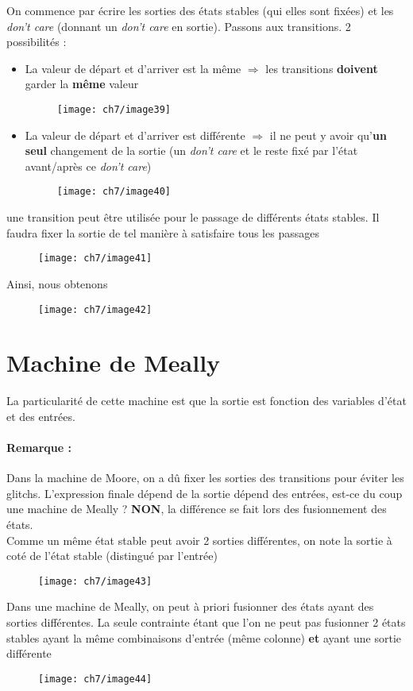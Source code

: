 On commence par écrire les sorties des états stables (qui elles sont fixées) et les \textit{don't care} (donnant un \textit{don't care} en sortie). Passons aux transitions. 2 possibilités :
\begin{itemize}
	\item La valeur de départ et d'arriver est la même $\Rightarrow$ les transitions \textbf{doivent} garder la \textbf{même} valeur
	\begin{figure}[H]
		\centering
		\texttt{[image: ch7/image39]}
	\end{figure}
	\item La valeur de départ et d'arriver est différente $\Rightarrow$ il ne peut y avoir qu'\textbf{un seul} changement de la sortie (un \textit{don't care} et le reste fixé par l'état avant/après ce \textit{don't care})
		\begin{figure}[H]
			\centering
			\texttt{[image: ch7/image40]}
		\end{figure}
\end{itemize}
\danger une transition peut être utilisée pour le passage de différents états stables. Il faudra fixer la sortie de tel manière à satisfaire tous les passages
\begin{figure}[H]
	\centering
	\texttt{[image: ch7/image41]}
\end{figure}
Ainsi, nous obtenons
\begin{figure}[H]
	\centering
	\texttt{[image: ch7/image42]}
\end{figure}
\section{Machine de Meally}
La particularité de cette machine est que la sortie est fonction des variables d'état et des entrées.\\
\paragraph{Remarque :} Dans la machine de Moore, on a dû fixer les sorties des transitions pour éviter les glitchs. L'expression finale dépend de la sortie dépend des entrées, est-ce du coup une machine de Meally ? \textbf{NON}, la différence se fait lors des fusionnement des états.\\

Comme un même état stable peut avoir 2 sorties différentes, on note la sortie à coté de l'état stable (distingué par l'entrée)
\begin{figure}[H]
	\centering
	\texttt{[image: ch7/image43]}
\end{figure}
Dans une machine de Meally, on peut à priori fusionner des états ayant des sorties différentes. La seule contrainte étant que l'on ne peut pas fusionner 2 états stables ayant la même combinaisons d'entrée (même colonne) \textbf{et} ayant une sortie différente
\begin{figure}[H]
	\centering
	\texttt{[image: ch7/image44]}
\end{figure}
